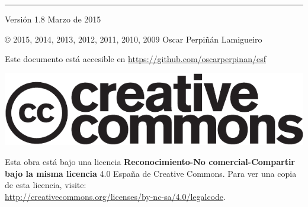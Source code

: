 
\chapterprecis{\vfill{}
}
\rule[.5ex]{\linewidth}{1pt} 

Versión 1.8 Marzo de 2015

© 2015, 2014, 2013, 2012, 2011, 2010, 2009 Oscar Perpiñán Lamigueiro

Este documento está accesible en \url{https://github.com/oscarperpinan/esf}

\begin{center}
\includegraphics[scale=0.5]{../figs/cc-logo}
\par\end{center}

Esta obra está bajo una licencia \textbf{Reconocimiento-No comercial-Compartir
bajo la misma licencia} 4.0 España de Creative Commons. Para ver una
copia de esta licencia, visite:\\
 \url{http://creativecommons.org/licenses/by-nc-sa/4.0/legalcode}.

